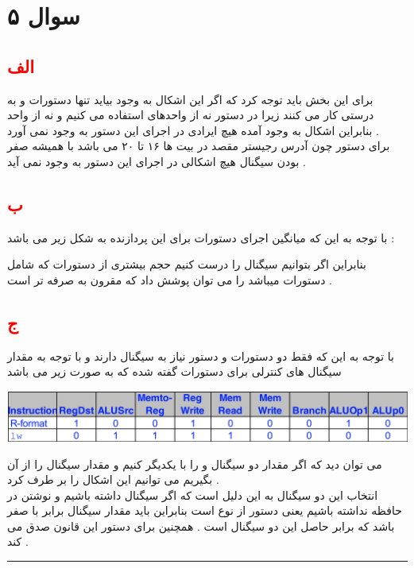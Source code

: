 \documentclass{article}
\begin{document}
\section*{سوال ۵ }
\subsection*{\textcolor{red}{الف}}
برای این بخش باید توجه کرد که اگر این اشکال به وجود بیاید تنها دستورات 
و 
به درستی کار می کنند زیرا در دستور 
نه از واحدهای 
استفاده می کنیم و نه از واحد 
بنابراین اشکال به وجود آمده هیچ ایرادی در اجرای این  دستور به وجود نمی آورد . 
\\
برای دستور 
چون آدرس رجیستر مقصد در بیت ها ۱۶ تا ۲۰ می باشد با همیشه صفر بودن سیگنال
هیچ اشکالی در اجرای این دستور به وجود نمی آید  . 
\subsection*{\textcolor{red}{ب}}
با توجه به این که میانگین اجرای دستورات برای این پردازنده به شکل زیر می باشد  : 
\begin{center}
\end{center}
بنابراین اگر بتوانیم سیگنال 
 را درست کنیم حجم بیشتری از دستورات که شامل دستورات 
 میباشد را می توان پوشش داد که مقرون به صرفه تر است  . 
 \subsection*{\textcolor{red}{ج}}
 با توجه به این که فقط دو دستورات 
 و دستور 
 نیاز به سیگنال 
 دارند و با توجه به مقدار سیگنال های کنترلی برای دستورات گفته شده که به صورت زیر می باشد  
 \begin{center}
 	\includegraphics[width=1\textwidth]{table}
 \end{center}
 می توان دید که اگر مقدار دو سیگنال 
 و 
را با یکدیگر 
کنیم و مقدار سیگنال 
را از آن بگیریم می توانیم این اشکال را بر طرف کرد . 
\\
انتخاب این دو سیگنال به این دلیل است که اگر سیگنال 
داشته باشیم و نوشتن در حافظه نداشته باشیم یعنی دستور از نوع 
است بنابراین باید مقدار سیگنال 
برابر با صفر باشد که برابر حاصل 
این دو سیگنال است  . همچنین برای دستور این قانون صدق می کند . 
\hrule
\end{document}
